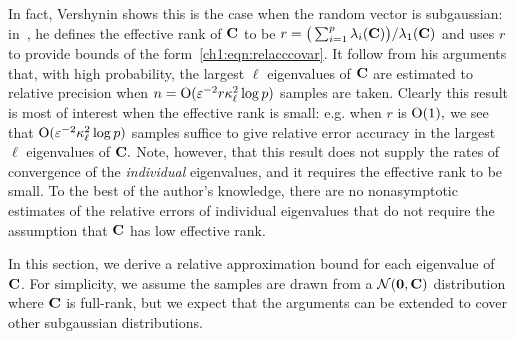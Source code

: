 In fact, Vershynin shows this is the case when the random vector
is subgaussian: in~\cite{Ver10}, he defines the effective rank of $\mathbf{C}$ to be
$r = \big(\sum_{i=1}^p \lambda_i(\mathbf{C})\big) / \lambda_1(\mathbf{C})$
and uses $r$ to provide bounds of the form~\eqref{ch1:eqn:relacccovar}.
It follow from his arguments that, with high probability, 
the largest $\ell$ eigenvalues of $\mathbf{C}$ are estimated to relative precision when
$n = \mathrm{O}(\varepsilon^{-2} r \kappa_\ell^2 \log p)$
samples are taken. Clearly this result is most of interest when
the effective rank is small: e.g. when $r$ is $\mathrm{O}(1),$ we see that 
$\mathrm{O}(\varepsilon^{-2} \kappa_\ell^2 \log p)$
samples suffice to give relative error accuracy in the largest $\ell$ eigenvalues of $\mathbf{C}.$
Note, however, that this result does not supply the rates of convergence
of the \emph{individual} eigenvalues, and it requires the effective rank to be small.
To the best of the author's knowledge, there are no nonasymptotic estimates of the 
relative errors of individual eigenvalues that do not require the 
assumption that $\mathbf{C}$ has low effective rank.


In this section, we derive a relative approximation bound for each eigenvalue of
$\mathbf{C}$.
For simplicity, we assume the samples are drawn from a
$\mathcal{N}(\mathbf{0}, \mathbf{C})$ distribution where $\mathbf{C}$ is full-rank, but
we expect that the arguments can be extended to cover other subgaussian distributions.

